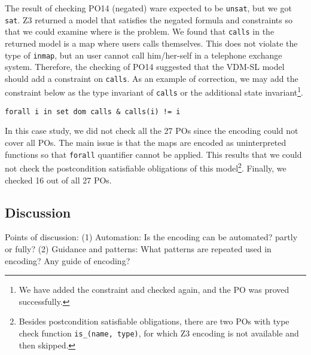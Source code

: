 The result of checking PO14 (negated) ware expected to be {\tt unsat}, but we got {\tt sat}. Z3 returned a model that satisfies the negated formula and constraints so that we could examine where is the problem. We found that {\tt calls} in the returned model is a map where users calls themselves. This does not violate the type of {\tt inmap}, but an user cannot call him/her-self in a telephone exchange system. Therefore, the checking of PO14 suggested that the VDM-SL model should add a constraint on {\tt calls}. As an example of correction, we may add the constraint below as the type invariant of {\tt calls} or the additional state invariant\footnote{We have added the constraint and checked again, and the PO was proved successfully.}.

\begin{mdframed}[roundcorner=5pt]
\begin{Verbatim}[fontsize=\small]
forall i in set dom calls & calls(i) != i
\end{Verbatim}
\end{mdframed}

In this case study, we did not check all the 27 POs since the encoding could not cover all POs. The main issue is that the maps are encoded as uninterpreted functions so that {\tt forall} quantifier cannot be applied. This results that we could not check the postcondition satisfiable obligations of this model\footnote{Besides postcondition satisfiable obligations, there are two POs with type check function {\tt is\_(name, type)}, for which Z3 encoding is not available and then skipped.}. Finally, we checked 16 out of all 27 POs.

\subsection{Discussion}



Points of discussion:
(1) Automation: Is the encoding can be automated? partly or fully? 
(2) Guidance and patterns: What patterns are repeated used in encoding? Any guide of encoding?

